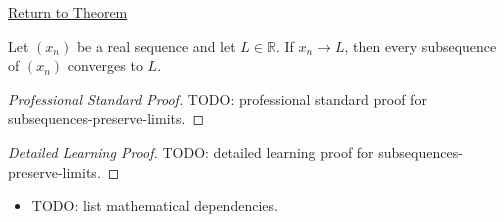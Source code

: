 \newpage
{}
\label{prf:subsequences-preserve-limits}

\begin{remark*}[Return]
\hyperref[thm:subsequences-preserve-limits]{Return to Theorem}
\end{remark*}

\begin{theorem*}
Let $(x_n)$ be a real sequence and let $L\in\mathbb{R}$. If $x_n\to L$,
then every subsequence of $(x_n)$ converges to $L$.

\smallskip
\noindent
\end{theorem*}

\begin{proof}[Professional Standard Proof]
\LRAProofBodyStart
TODO: professional standard proof for subsequences-preserve-limits.
\end{proof}

\begin{proof}[Detailed Learning Proof]
\LRAProofBodyStart
TODO: detailed learning proof for subsequences-preserve-limits.
\end{proof}

\begin{remark*}
\end{remark*}

\begin{dependencies}
\begin{itemize}
  \item TODO: list mathematical dependencies.
\end{itemize}
\end{dependencies}

\clearpage
